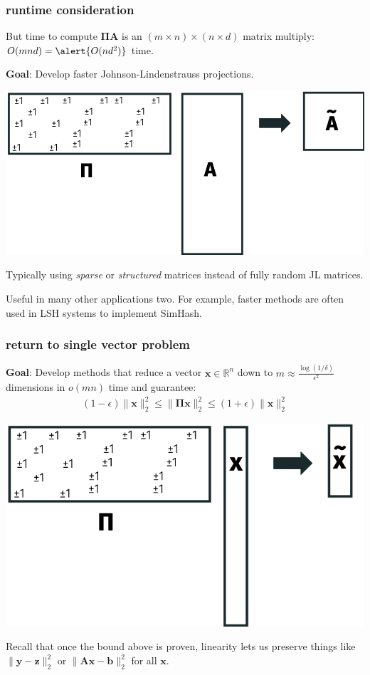 \documentclass[compress]{beamer}
\newcommand{\bs}[1]{\boldsymbol{#1}}
\newcommand{\bv}[1]{\mathbf{#1}}
\newcommand{\R}{\mathbb{R}}
\begin{document}
\begin{frame}[t]
	\frametitle{runtime consideration}
	But time to compute $\bs{\Pi}\bv{A}$ is an $(m\times n) \times (n \times d)$ matrix multiply: $O(mnd) = \alert{O(nd^2)}$ \alert{time}.
	
	\begin{center}
		\textbf{Goal}: Develop faster Johnson-Lindenstrauss projections.
		\vspace{.5em}
		
		\includegraphics[width=.6\textwidth]{sparseJL.png}
		
		Typically using \emph{sparse} or \emph{structured} matrices instead of fully random JL matrices.
		
		Useful in many other applications two. For example, faster methods are often used in LSH systems to implement SimHash.
	\end{center}
\end{frame}

\begin{frame}[t]
	\frametitle{return to single vector problem}
	\textbf{Goal}: Develop methods that reduce a vector $\bv{x}\in \R^n$ down to $m \approx \frac{\log(1/\delta)}{\epsilon^2}$ dimensions in $o(mn)$ time and guarantee:
	\begin{align*}
		(1-\epsilon)\|\bv{x}\|_2^2 \leq \|\bs{\Pi}\bv{x}\|_2^2 \leq (1+\epsilon)\|\bv{x}\|_2^2
	\end{align*}
	\begin{center}
		\includegraphics[width=.6\textwidth]{single_vec.png}
	\end{center}

Recall that once the bound above is proven, linearity lets us preserve things like $\|\bv{y} - \bv{z}\|_2^2$ or $\|\bv{Ax} - \bv{b}\|_2^2$ for all $\bv{x}$.
\end{frame}
\end{document}
